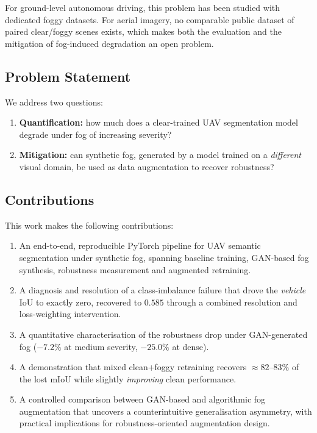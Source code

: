 \documentclass[11pt,a4paper]{article}
\begin{document}
For ground-level autonomous driving, this problem has been studied with
dedicated foggy datasets. For aerial imagery, no comparable public dataset of
paired clear/foggy scenes exists, which makes both the evaluation and the
mitigation of fog-induced degradation an open problem.

\subsection{Problem Statement}
We address two questions:
\begin{enumerate}[leftmargin=*]
  \item \textbf{Quantification:} how much does a clear-trained UAV
  segmentation model degrade under fog of increasing severity?
  \item \textbf{Mitigation:} can synthetic fog, generated by a model trained
  on a \emph{different} visual domain, be used as data augmentation to recover
  robustness?
\end{enumerate}

\subsection{Contributions}
This work makes the following contributions:
\begin{enumerate}[leftmargin=*]
  \item An end-to-end, reproducible PyTorch pipeline for UAV semantic
  segmentation under synthetic fog, spanning baseline training, GAN-based fog
  synthesis, robustness measurement and augmented retraining.
  \item A diagnosis and resolution of a class-imbalance failure that drove the
  \emph{vehicle} IoU to exactly zero, recovered to $0.585$ through a combined
  resolution and loss-weighting intervention.
  \item A quantitative characterisation of the robustness drop under
  GAN-generated fog ($-7.2\%$ at medium severity, $-25.0\%$ at dense).
  \item A demonstration that mixed clean+foggy retraining recovers $\approx
  82$--$83\%$ of the lost mIoU while slightly \emph{improving} clean
  performance.
  \item A controlled comparison between GAN-based and algorithmic fog
  augmentation that uncovers a counterintuitive generalisation asymmetry,
  with practical implications for robustness-oriented augmentation design.
\end{enumerate}
\end{document}
